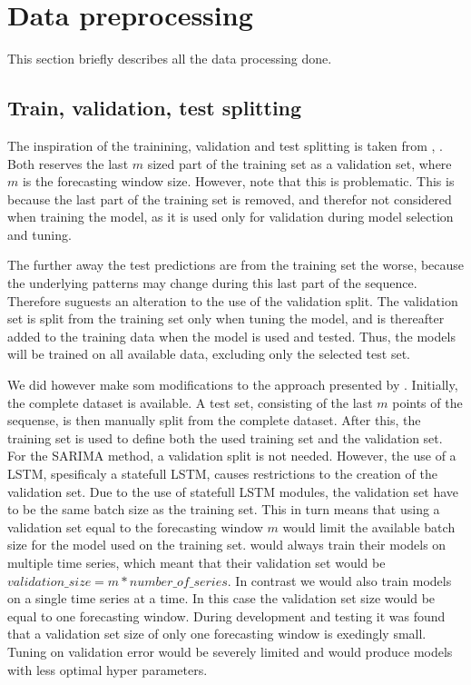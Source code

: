 \section{Data preprocessing}
\label{section:Data:Preprocessing}
This section briefly describes all the data processing done.

\subsection{Train, validation, test splitting}

The inspiration of the trainining, validation and test splitting is taken from
\cite{Bandara2019}, \cite{Hewamalage2021}.
Both reserves the last $m$ sized part of the training set as a validation set,
where $m$ is the forecasting window size.
However, \cite{Hewamalage2021} note that this is problematic.
This is because the last part of the training set is removed,
and therefor not considered when training the model, as it is used only for validation during model selection and tuning.

The further away the test predictions are from the training set the worse,
because the underlying patterns may change during this last part of the sequence.
Therefore \cite{Hewamalage2021} suguests an alteration to the use of the validation split.
The validation set is split from the training set only when tuning the model,
and is thereafter added to the training data when the model is used and tested.
Thus, the models will be trained on all available data, excluding only the selected test set.

We did however make som modifications to the approach presented by \cite{Hewamalage2021}.
Initially, the complete dataset is available.
A test set, consisting of the last $m$ points of the sequense, is then manually split from the complete dataset.
After this, the training set is used to define both the used training set and the validation set.
For the SARIMA method, a validation split is not needed.
However, the use of a LSTM, spesificaly a statefull LSTM, causes restrictions to the creation of the validation set.
Due to the use of statefull LSTM modules, the validation set have to be the same batch size as the training set.
This in turn means that using a validation set equal to the forecasting window $m$ would limit the available batch size for the model
used on the training set.
\cite{Bandara2019} would always train their models on multiple time series,
which meant that their validation set would be $validation\_size = m * number\_of\_series$.
In contrast we would also train models on a single time series at a time.
In this case the validation set size would be equal to one forecasting window.
During development and testing it was found that a validation set size of only one forecasting window is exedingly small.
Tuning on validation error would be severely limited and would produce models with less optimal hyper parameters.

